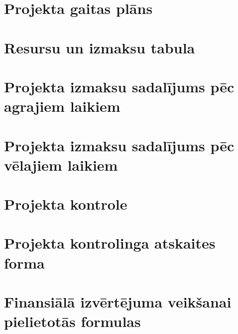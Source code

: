 \section{Projekta gaitas plāns}
	\label{app:Projekta_gaitas_plans}
    \clearpage
\section{Resursu un izmaksu tabula}
	\label{app:Projekta_resursu_izmaksu_tabula}
    \clearpage
\section{Projekta izmaksu sadalījums pēc agrajiem laikiem}
	\label{app:Projekta_izmaksu_salidzinajums_agrais}
    \clearpage
\section{Projekta izmaksu sadalījums pēc vēlajiem laikiem}
	\label{app:Projekta_izmaksu_salidzinajums_velais}
    \clearpage
\section{Projekta kontrole}
	\label{app:Projekta_konrole}
    \clearpage
\section{Projekta kontrolinga atskaites forma}
	\label{app:Projekta_atskaitas_forma}
    \clearpage
\section{Finansiālā izvērtējuma veikšanai pielietotās formulas }
	\label{app:Projekta_formulas}
    \clearpage
